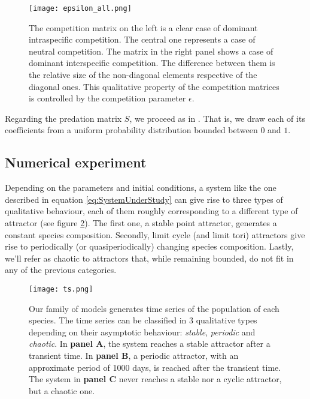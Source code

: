 \begin{figure}[H]
	\begin{center}
		\texttt{[image: epsilon\_all.png]}
	\end{center}
	\caption{The competition matrix on the left is a clear case of dominant intraspecific competition. The central one represents a case of neutral competition. The matrix in the right panel shows a case of dominant interspecific competition. The difference between them is the relative size of the non-diagonal elements respective of the diagonal ones. This qualitative property of the competition matrices is controlled by the competition parameter $\epsilon$.}
	\label{fig:CompetitionParameter}
\end{figure}

Regarding the predation matrix $S$, we proceed as in \citet{Dakos2009b}. That is, we draw each of its coefficients from a uniform probability distribution bounded between $0$ and $1$.

\subsection{Numerical experiment}
\label{subsec:NumericalExperiment}

Depending on the parameters and initial conditions, a system like the one described in equation \eqref{eq:SystemUnderStudy} can give rise to three types of qualitative behaviour, each of them roughly corresponding to a different type of attractor (see figure \ref{fig:TimeSeries}). The first one, a stable point attractor, generates a constant species composition. Secondly, limit cycle (and limit tori) attractors give rise to periodically (or quasiperiodically) changing species composition. Lastly, we'll refer as chaotic to attractors that, while remaining bounded, do not fit in any of the previous categories.

\begin{figure}
	\begin{center}
		\texttt{[image: ts.png]}
	\end{center}
	\caption{Our family of models generates time series of the population of each species. The time series can be classified in $3$ qualitative types depending on their asymptotic behaviour: \textit{stable}, \textit{periodic} and \textit{chaotic}. In \textbf{panel A}, the system reaches a stable attractor after a transient time. In \textbf{panel B}, a periodic attractor, with an approximate period of 1000 days, is reached after the transient time. The system in \textbf{panel C} never reaches a stable nor a cyclic attractor, but a chaotic one.}
	\label{fig:TimeSeries}
\end{figure}

